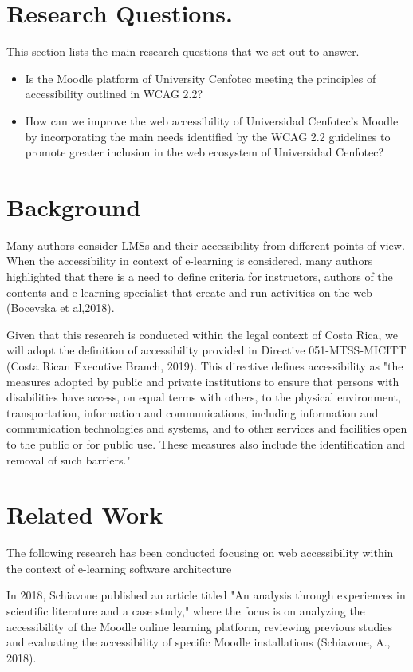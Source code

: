 \documentclass{article}
\begin{document}
\section{Research Questions.}
This section lists the main research questions that we set out to answer.
\begin{itemize}
    \item Is the Moodle platform of University Cenfotec meeting the principles of accessibility outlined in WCAG 2.2?
    \item How can we improve the web accessibility of Universidad Cenfotec's Moodle by incorporating the main needs identified by the WCAG 2.2 guidelines to promote greater inclusion in the web ecosystem of Universidad Cenfotec?
\end{itemize}

\section{Background}
Many authors consider LMSs and their accessibility from different points of view. When the accessibility in context of e-learning is considered, many authors highlighted that there is a need to define criteria for instructors, authors of the contents and e-learning specialist that create and run activities on the web (Bocevska et al,2018).

Given that this research is conducted within the legal context of Costa Rica, we will adopt the definition of accessibility provided in Directive 051-MTSS-MICITT (Costa Rican Executive Branch, 2019). This directive defines accessibility as "the measures adopted by public and private institutions to ensure that persons with disabilities have access, on equal terms with others, to the physical environment, transportation, information and communications, including information and communication technologies and systems, and to other services and facilities open to the public or for public use. These measures also include the identification and removal of such barriers."

\section{Related Work}
The following research has been conducted focusing on web accessibility within the context of e-learning software architecture

In 2018, Schiavone published an article titled "An analysis through experiences in scientific literature and a case study," where the focus is on analyzing the accessibility of the Moodle online learning platform, reviewing previous studies and evaluating the accessibility of specific Moodle installations (Schiavone, A., 2018).
\end{document}
